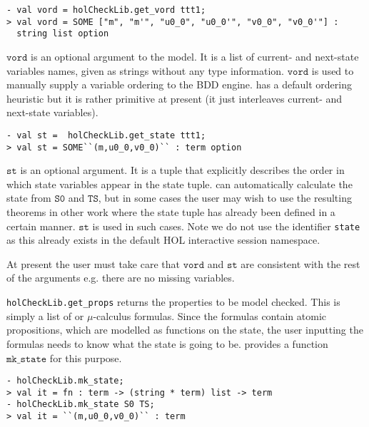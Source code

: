 \begin{session}\begin{verbatim}
- val vord = holCheckLib.get_vord ttt1;
> val vord = SOME ["m", "m'", "u0_0", "u0_0'", "v0_0", "v0_0'"] :
  string list option
\end{verbatim}\end{session}

\(\mathtt{vord}\) is an optional argument to the model. It is a list of current- and next-state variables names, given as strings without any type information. \(\mathtt{vord}\) is used to manually supply a variable ordering to the BDD engine. \hc{} has a default ordering heuristic but it is rather primitive at present (it just interleaves current- and next-state variables).

\begin{session}\begin{verbatim}
- val st =  holCheckLib.get_state ttt1;
> val st = SOME``(m,u0_0,v0_0)`` : term option
\end{verbatim}\end{session}

\(\mathtt{st}\) is an optional argument. It is a \HOL{} tuple that explicitly describes the order in which state variables appear in the state tuple. \hc{} can automatically calculate the state from \(\mathtt{S0}\) and \(\mathtt{TS}\), but in some cases the user may wish to use the resulting theorems in other work where the state tuple has already been defined in a certain manner. \(\mathtt{st}\) is used in such cases. Note we do not use the identifier \texttt{state} as this already exists in the default HOL interactive session namespace.

At present the user must take care that \(\mathtt{vord}\) and \(\mathtt{st}\) are consistent with the rest of the arguments e.g. there are no missing variables.

\texttt{holCheckLib.get\_props} returns the properties to be model checked. This is simply a list of \ctl or \(\mu\)-calculus formulas. Since the formulas contain atomic propositions, which are modelled as functions on the state, the user inputting the formulas needs to know what the state is going to be. \hc{} provides a function \(\mathtt{mk\_state}\) for this purpose.

\begin{session}
\begin{verbatim}
- holCheckLib.mk_state;
> val it = fn : term -> (string * term) list -> term
- holCheckLib.mk_state S0 TS;
> val it = ``(m,u0_0,v0_0)`` : term
\end{verbatim}
\end{session}

